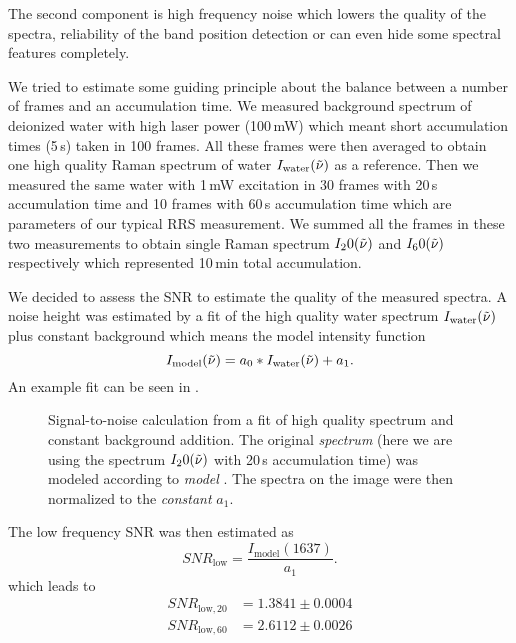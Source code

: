 The second component is high frequency noise which lowers the quality of the
spectra, reliability of the band position detection or can even hide some
spectral features completely.

We tried to estimate some guiding principle about the balance between a number
of frames and an accumulation time. We measured background spectrum of
deionized water with high laser power (100\,mW) which meant short accumulation
times (5\,s) taken in 100 frames. All these frames were then averaged to obtain
one high quality Raman spectrum of water $I_\text{water}(\tilde{\nu})$ as a reference.
Then we measured the same water with 1\,mW excitation in 30 frames with 20\,s
accumulation time and 10 frames with 60\,s accumulation time which are
parameters of our typical RRS measurement. We summed all the frames in these
two measurements to obtain single Raman spectrum $I_20(\tilde{\nu})$ and $I_60(\tilde{\nu})$
respectively which represented 10\,min total accumulation.

We decided to assess the SNR to estimate the quality of the measured spectra.
A noise height was estimated by a fit of the high quality water spectrum
$I_\text{water}(\tilde{\nu})$ plus constant background which means the model intensity
function
\begin{equation}
	I_\text{model}(\wn) = a_0 * I_\text{water}(\wn) + a_1.
	\label{\eqnlabel{accum_length:sn_model}}
\end{equation}
An example fit can be seen in .

\begin{figure}
	\centering
	
	\caption{Signal-to-noise calculation from a fit of high quality spectrum
		and constant background addition. The original \emph{spectrum} (here we are
		using the spectrum $I_20(\tilde{\nu})$ with 20\,s accumulation time) was modeled
		according to \emph{model} . The spectra on
		the image were then normalized to the \emph{constant} $a_1$.}
	\label{\figlabel{accum_length:sn_ratio}}
\end{figure}

The low frequency SNR was then estimated as
\begin{equation*}
	SNR_\text{low} = \frac{I_\text{model}(1637)}{a_1}.
\end{equation*}
which leads to
\begin{align*}
	SNR_{\text{low},20} &= 1.3841 \pm 0.0004 \\
	SNR_{\text{low},60} &= 2.6112 \pm 0.0026
\end{align*}

